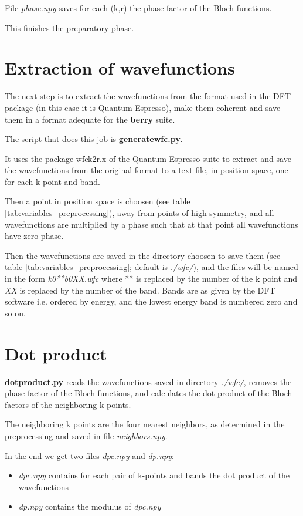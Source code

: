 \documentclass[a4paper,12pt]{report}
\begin{document}
File \emph{phase.npy} saves for each (k,r) the phase factor of the Bloch functions.

This finishes the preparatory phase.

\section{Extraction of wavefunctions}

The next step is to extract the wavefunctions from the format used in the DFT package
(in this case it is {\sc Quantum Espresso}),
make them coherent and save them in a format adequate for the \textbf{berry} suite.

The script that does this job is \textbf{generatewfc.py}.

It uses the package wfck2r.x of the {\sc Quantum Espresso} suite to extract and save the wavefunctions
from the original format to a text file, in position space, one for each k-point and band.

Then a point in position space is choosen (see table \ref{tab:variables_preprocessing}),
away from points of high symmetry, and all wavefunctions
are multiplied by a phase such that at that point all wavefunctions have zero phase.

Then the wavefunctions are saved in the directory choosen to save them
(see table \ref{tab:variables_preprocessing}; default is \emph{./wfc/}),
and the files will be named in the form \emph{k0**b0XX.wfc} where ** is replaced by the number of the k point
and \emph{XX} is replaced by the number of the band.
Bands are as given by the DFT software i.e. ordered by energy, and the lowest energy band is numbered zero and so on.


\section{Dot product}

\textbf{dotproduct.py} reads the wavefunctions saved in directory \emph{./wfc/},
removes the phase factor of the Bloch functions, and calculates the dot product
of the Bloch factors of the neighboring k points.

The neighboring k points are the four nearest neighbors, as determined in the preprocessing
and saved in file \emph{neighbors.npy}.

In the end we get two files \emph{dpc.npy} and \emph{dp.npy}:
\begin{itemize}
 \item \emph{dpc.npy} contains for each pair of k-points and bands the dot product of the wavefunctions
 \item \emph{dp.npy} contains the modulus of \emph{dpc.npy}
\end{itemize}
\end{document}

